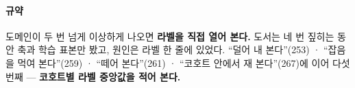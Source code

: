 \documentclass[10pt]{article}
\begin{document}
\paragraph{규약} 도메인이 두 번 넘게 이상하게 나오면 \textbf{라벨을 직접
열어 본다.} 도서는 네 번 짚히는 동안 축과 학습 표본만 봤고, 원인은 라벨
한 줄에 있었다. ``덜어 내 본다''(253) · ``잡음을 먹여 본다''(259) ·
``떼어 본다''(261) · ``코호트 안에서 재 본다''(267)에 이어 다섯 번째 ---
\textbf{코호트별 라벨 중앙값을 적어 본다.}
\end{document}
